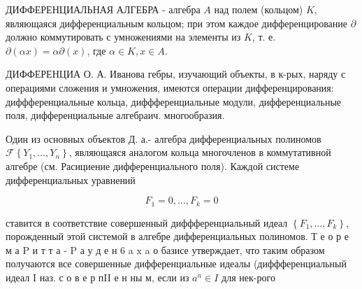 \documentclass[10pt]{article}
\begin{document}
ДИФФЕРЕНЦИАЛЬНАЯ АЛГЕБРА - алгебра $A$ над полем (кольцом) $K$, являющаяся дифференциальным кольцом; при этом каждое дифференцирование $\partial$ должно коммутировать с умножениями на элементы из $K$, т. е. $\partial(\alpha x)=\alpha \partial(x)$, где $\alpha \in K, x \in A$.



ДИФФЕРЕНЦИА О. А. Иванова гебры, изучающий объекты, в к-рых, наряду с операциями сложения и умножения, имеются операции дифференцирования: диффференциальные кольца, диффференциальные модули, дифференциальные поля, дифференциальные алгебраич. многообразия.



Один из основных объектов Д. а.- алгебра дифференциальных полиномов $\mathscr{F}\left\{Y_{1}, \ldots, Y_{n}\right\}$, являющаяся аналогом кольца многочленов в коммутативной алгебре (см. Расициение дифференциального поля). Каждой системе дифференциальных уравнений



\[

F_{1}=0, \ldots, F_{k}=0

\]



ставится в соответствие совершенный диффференциальный идеал $\left\{F_{1}, \ldots, F_{k}\right\}$, порожденный этой системой в алгебре дифференциальных полиномов. Т е о р е м а $\mathrm{P}$ и т т а - $\mathrm{P}$ а у д е н 6 a $\mathrm{x}$ a $о$ базисе утверждает, что таким образом получаются все совершенные дифференциальные идеалы (диффференциальный идеал I наз. с о в е р пII е н ны м, если из $a^{n} \in I$ для нек-рого
\end{document}
